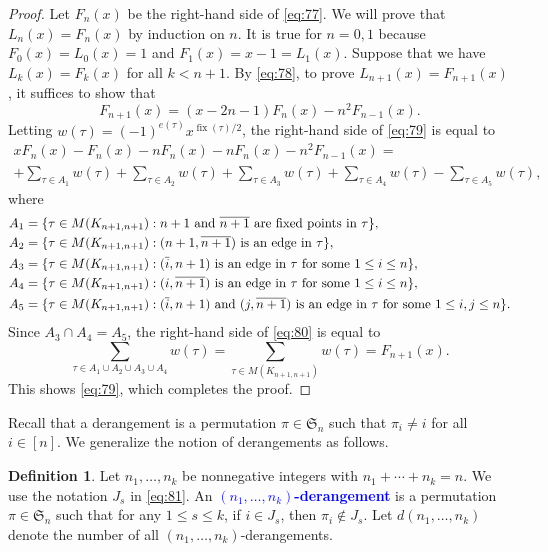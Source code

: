 \documentclass[oneside]{book}
\numberwithin{equation}{section}
\theoremstyle{definition}
\newtheorem{defn}[thm]{Definition}
\newcommand\fix{\operatorname{fix}}
\newcommand\sym{\mathfrak{S}}
\renewcommand\emph[1]{\textcolor{blue}{\bf #1}}
\begin{document}
\begin{proof}
  Let \( F_n(x) \) be the right-hand side of \eqref{eq:77}. We will
  prove that \( L_n(x) = F_n(x) \) by induction on \( n \). It is true
  for \( n=0,1 \) because \( F_0(x) = L_0(x) = 1 \) and
  \( F_1(x) = x-1 = L_1(x) \). Suppose that we have
  \( L_k(x) = F_k(x) \) for all \( k<n+1 \). By \eqref{eq:78}, to
  prove \( L_{n+1}(x) = F_{n+1}(x) \), it suffices to show that
  \begin{equation}\label{eq:79}
  F_{n+1}(x) = (x-2n-1) F_n(x) - n^2 F_{n-1}(x).
  \end{equation}
  Letting \( w(\tau) = (-1)^{e(\tau)} x^{\fix(\tau)/2} \), the right-hand
  side of \eqref{eq:79} is equal to
 \begin{multline}\label{eq:80}
   xF_n(x)-F_n(x)-nF_n(x)-nF_n(x) - n^2 F_{n-1}(x) = \\
  + \sum_{\tau \in A_1} w(\tau)
 +\sum_{\tau \in A_2} w(\tau)
 +\sum_{\tau \in A_3} w(\tau)
 +\sum_{\tau \in A_4} w(\tau)
 -\sum_{\tau \in A_5} w(\tau),
 \end{multline} 
 where
 \begin{align*}
   A_1 &= \{ \tau\in M(K_{n+1,n+1}): \mbox{\( n+1 \) and \( \overline{n+1} \) are fixed points in \( \tau \)}\}, \\
   A_2 &= \{ \tau\in M(K_{n+1,n+1}): \mbox{\( (n+1,\overline{n+1}) \) is an edge in \( \tau \)}\}, \\
   A_3 &= \{ \tau\in M(K_{n+1,n+1}): \mbox{\( (\overline{i},n+1) \) is an edge in \( \tau \) for some \( 1\le i\le n \)}\}, \\
   A_4 &= \{ \tau\in M(K_{n+1,n+1}): \mbox{\( (i,\overline{n+1}) \) is an edge in \( \tau \) for some \( 1\le i\le n \)}\}, \\
   A_5 &= \{ \tau\in M(K_{n+1,n+1}): \mbox{\( (\overline{i},n+1) \) and \( (j,\overline{n+1}) \) is an edge in \( \tau \) for some \( 1\le i,j\le n \)}\}.
 \end{align*}
 Since \( A_3\cap A_4 = A_5 \), the right-hand side of \eqref{eq:80}
 is equal to
 \[
   \sum_{\tau \in A_1\cup A_2\cup A_3\cup A_4} w(\tau) = \sum_{\tau
     \in M(K_{n+1,n+1})} w(\tau)  = F_{n+1}(x).
 \]
 This shows \eqref{eq:79}, which completes the proof.
\end{proof}


Recall that a derangement is a permutation \( \pi\in \sym_n \)
such that \( \pi_i\ne i \) for all \( i\in [n] \). We generalize the
notion of derangements as follows.

\begin{defn}
  Let \( n_1,\dots,n_k \) be nonnegative integers with
  \( n_1 + \cdots + n_k = n \). We use the notation \( J_s \) in
  \eqref{eq:81}. An \emph{\( (n_1,\dots,n_k) \)-derangement} is a
  permutation \( \pi\in \sym_n \) such that for any \( 1\le s\le k \),
  if \( i\in J_s \), then \( \pi_i \not\in J_s \). Let
  \( d(n_1,\dots,n_k) \) denote the number of all
  \( (n_1,\dots,n_k) \)-derangements.
\end{defn}
\end{document}
